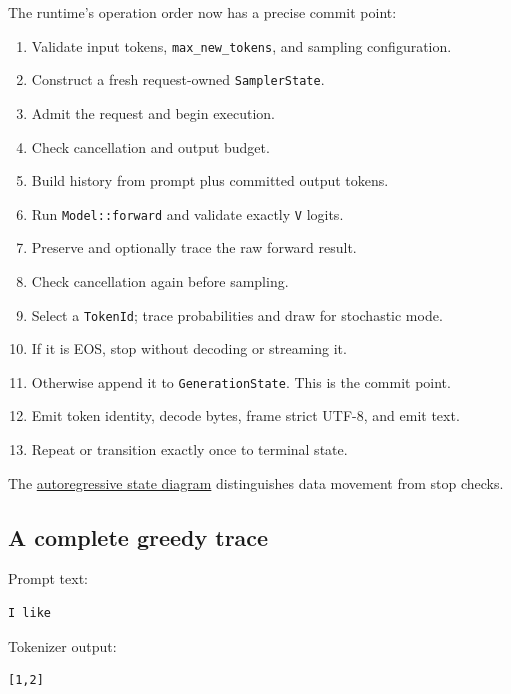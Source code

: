 The runtime's operation order now has a precise commit point:

\begin{enumerate}
\def\labelenumi{\arabic{enumi}.}
\tightlist
\item
  Validate input tokens, \texttt{max\_new\_tokens}, and sampling
  configuration.
\item
  Construct a fresh request-owned \texttt{SamplerState}.
\item
  Admit the request and begin execution.
\item
  Check cancellation and output budget.
\item
  Build history from prompt plus committed output tokens.
\item
  Run \texttt{Model::forward} and validate exactly \texttt{V} logits.
\item
  Preserve and optionally trace the raw forward result.
\item
  Check cancellation again before sampling.
\item
  Select a \texttt{TokenId}; trace probabilities and draw for stochastic
  mode.
\item
  If it is EOS, stop without decoding or streaming it.
\item
  Otherwise append it to \texttt{GenerationState}. This is the commit
  point.
\item
  Emit token identity, decode bytes, frame strict UTF-8, and emit text.
\item
  Repeat or transition exactly once to terminal state.
\end{enumerate}

The
\href{https://github.com/hermonai/inside-the-llm-engine/blob/astra-visual-rewrite/diagrams/sampling/autoregressive-state.txt}{autoregressive
state diagram} distinguishes data movement from stop checks.

\subsection{A complete greedy trace}\label{a-complete-greedy-trace}

Prompt text:

\begin{verbatim}
I like
\end{verbatim}

Tokenizer output:

\begin{verbatim}
[1,2]
\end{verbatim}

